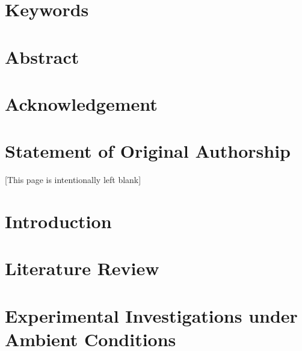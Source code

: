 \documentclass[twoside,openright,12pt]{book}
\makeatletter
\newcounter{savepage}
\def\cleardoublepage{\clearpage%
	\if@twoside
	\ifodd\c@page\else
	\vspace*{\fill}
	\hfill
	\begin{center}
		[This page is intentionally left blank]
	\end{center}
	\vspace{\fill}
	\thispagestyle{empty}
	\newpage
	\if@twocolumn\hbox{}\newpage\fi
	\fi
	\fi
}
\makeatother
\begin{document}



\chapter*{Keywords}


\chapter*{Abstract}{}


\tableofcontents
\listoftables
\listoffigures

\chapter*{Acknowledgement}


\chapter*{Statement of Original Authorship}


\cleardoublepage




\chapter{Introduction}
\label{ch:Introduction} 
  

\chapter{Literature Review}
\label{ch:Literature}       
 

\chapter{Experimental Investigations under Ambient Conditions}
\label{ch:Ambient}       
 
\end{document}
